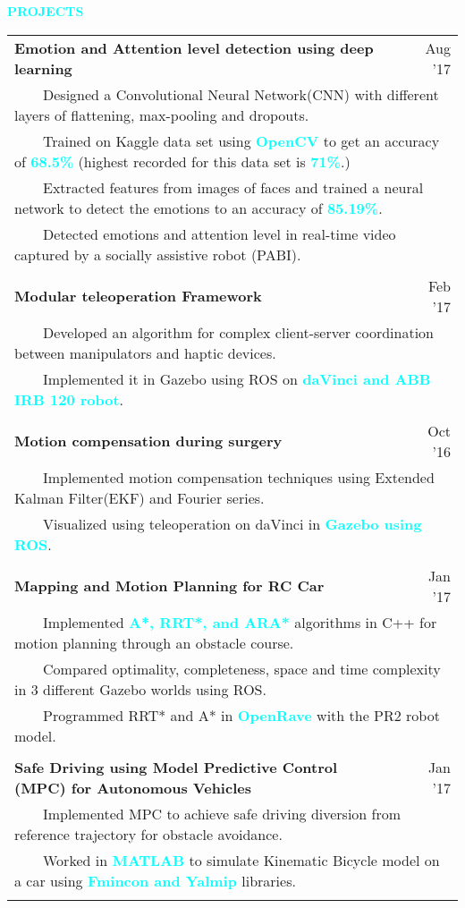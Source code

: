 \documentclass[10.9pt,letter]{article}
\newcommand{\tabitem}{~~\llap{\textbullet}~~}
\newcommand{\aquaText}[1]{\textcolor{aqua}{\textbf{#1}}}
\newcommand{\para}{\\[.5\baselineskip]}
\newcommand{\newBull}[1]{\multicolumn{2}{l}{\tabitem #1}\\}
\newcommand{\newSeg}[3]{\textbf{#1} & {#2}\textemdash{#3}\\}
\begin{document}
\aquaText{PROJECTS}\para
\begin{tabular}{p{} r}
    \newSeg{Emotion and Attention level detection using deep learning}{Aug '17}{May '18}
        \newBull{Designed a Convolutional Neural Network(CNN) with different layers of flattening, max-pooling and dropouts.}
        \newBull{Trained on Kaggle data set using \aquaText{OpenCV} to get an accuracy of \aquaText{68.5\%}  (highest recorded for this data set is \aquaText{71\%}.)}
        \newBull{Extracted features from images of faces and trained a neural network to detect the emotions to an accuracy of \aquaText{85.19\%}.}
        \newBull{Detected emotions and attention level in real-time video captured by  a socially assistive robot (PABI).}\\
  \newSeg{Modular teleoperation Framework}{Feb '17}{May '17}
       \newBull{Developed an algorithm for complex client-server coordination between manipulators and haptic devices.}
       \newBull{Implemented it in Gazebo using ROS on \aquaText{daVinci and ABB IRB 120 robot}.}\\
  \newSeg{Motion compensation during surgery}{Oct '16}{Dec '16}
       \newBull{Implemented motion compensation techniques using Extended Kalman Filter(EKF) and Fourier series.}
       \newBull{Visualized using teleoperation on daVinci in \aquaText{Gazebo using ROS}.}\\
           \newSeg{Mapping and Motion Planning for RC Car}{Jan '17}{May '17}
        \newBull{Implemented \aquaText{A*, RRT*, and ARA*} algorithms in C++ for motion planning through an obstacle course. }
        \newBull{Compared optimality, completeness, space and time complexity in 3 different Gazebo worlds using ROS.}
        \newBull{Programmed RRT* and A* in \aquaText{OpenRave} with the PR2 robot model.}\\
    \newSeg{Safe Driving using Model Predictive Control (MPC) for Autonomous Vehicles}{Jan '17}{May '17}
       \newBull{Implemented MPC to achieve safe driving diversion from reference trajectory for obstacle avoidance.}
       \newBull{Worked in \aquaText{MATLAB} to simulate Kinematic Bicycle model on a car using \aquaText{Fmincon and Yalmip} libraries.}\\

\end{tabular}
\end{document}
